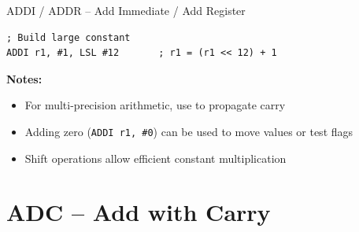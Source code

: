 \begin{instructionbox}{ADDI / ADDR -- Add Immediate / Add Register}
\begin{lstlisting}
; Build large constant
ADDI r1, #1, LSL #12       ; r1 = (r1 << 12) + 1
\end{lstlisting}

	\textbf{Notes:}
	\begin{itemize}
		\item For multi-precision arithmetic, use  to propagate carry
		\item Adding zero (\texttt{ADDI r1, \#0}) can be used to move values or test flags
		\item Shift operations allow efficient constant multiplication
	\end{itemize}
\end{instructionbox}

\section{ADC -- Add with Carry}

